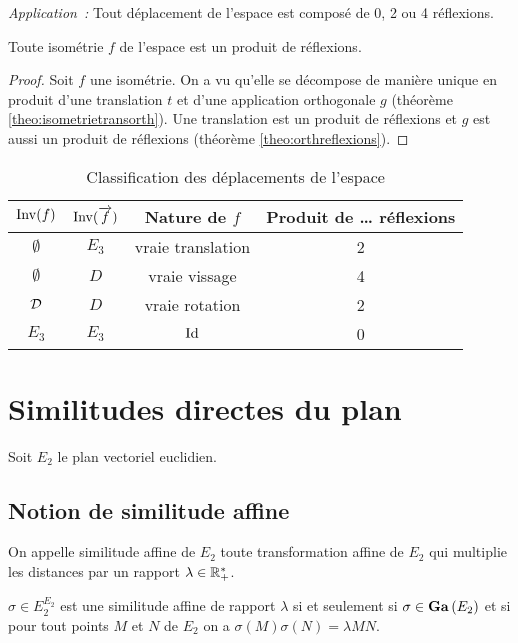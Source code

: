 \emph{Application~:} Tout déplacement de l'espace est composé de 0, 2 ou 4 
réflexions.

\begin{cor}
  Toute isométrie \(f\) de l'espace est un produit de réflexions.
\end{cor}
\begin{proof}
  Soit \(f\) une isométrie. On a vu qu'elle se décompose de manière unique en 
  produit d'une translation \(t\) et d'une application orthogonale \(g\) 
  (théorème
  \ref{theo:isometrietransorth}). Une translation est un produit de réflexions 
  et \(g\) est aussi un produit de réflexions (théorème
  \ref{theo:orthreflexions}).
\end{proof}

\begin{table}
  \centering
  \begin{tabular}{|c|c|c|c|}\hline
    \(\operatorname{Inv}(f)\) & \(\operatorname{Inv}(\overrightarrow{f})\) & Nature de \(f\) & Produit de \ldots 
    réflexions \\ \hline
    \(\emptyset\) & \(E_3\) & vraie translation & 2 \\
    \(\emptyset\) & \(D\) & vraie vissage & 4 \\
    \(\mathcal{D}\) & \(D\)& vraie rotation & 2 \\
    \(E_3\) & \(E_3\) & \(\operatorname{Id}\) & 0 \\ \hline
  \end{tabular}
  \caption{Classification des déplacements de l'espace}
  \label{tab:classdéplacementsespace}
\end{table}

\section{Similitudes directes du plan}

Soit \(E_2\) le plan vectoriel euclidien.

\subsection{Notion de similitude affine}

\begin{defdef}
  On appelle similitude affine de \(E_2\) toute transformation affine de \(E_2\) 
  qui multiplie les distances par un rapport \(\lambda \in \mathbb{R}_{+}^{*}\).

  \(\sigma \in E_2^{E_2}\) est une similitude affine de rapport \(\lambda\) si 
  et seulement si \(\sigma \in \mathbf{Ga}\left(E_2\right)\) et si pour tout points \(M\) et \(N\) 
  de \(E_2\) on a \(\sigma(M)\sigma(N)=\lambda MN\).
\end{defdef}

